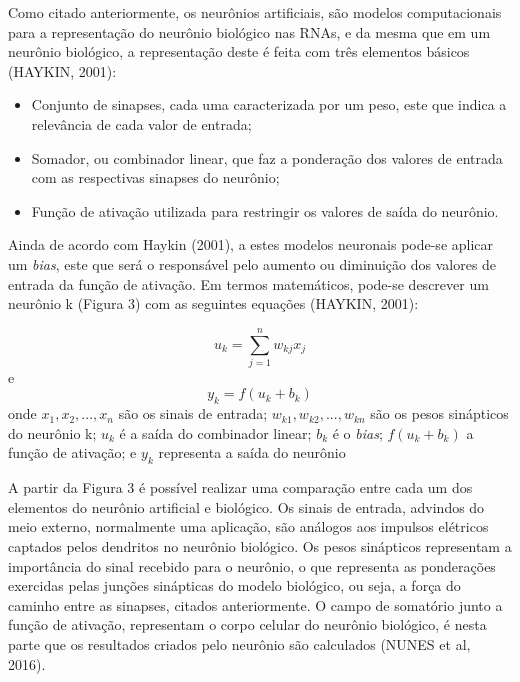 Como citado anteriormente, os neurônios artificiais, são modelos computacionais para a representação do neurônio biológico nas RNAs, e da mesma que em um neurônio biológico, a representação deste é feita com três elementos básicos (HAYKIN, 2001):  

\begin{itemize}
	\item Conjunto de sinapses, cada uma caracterizada por um peso, este que indica a relevância de cada valor de entrada;
	\item Somador, ou combinador linear, que faz a ponderação dos valores de entrada com as respectivas sinapses do neurônio;
	\item Função de ativação utilizada para restringir os valores de saída do neurônio.
\end{itemize}

Ainda de acordo com Haykin (2001), a estes modelos neuronais pode-se aplicar um \textit{bias}, este que será o responsável pelo aumento ou diminuição dos valores de entrada da função de ativação. Em termos matemáticos, pode-se descrever um neurônio k (Figura 3) com as seguintes equações (HAYKIN, 2001):

\begin{equation}
	u_{k} = \sum_{j=1}^{n} w_{kj} x_{j}
\end{equation}
e
\begin{equation}
	y_{k} = f(u_{k} + b_{k})	
\end{equation}
onde $ x_{1}, x_{2}, ..., x_{n} $ são os sinais de entrada; $ w_{k1}, w_{k2}, ..., w_{kn} $ são os pesos sinápticos do neurônio k; $ u_{k} $ é a saída do combinador linear; $ b_{k} $ é o \textit{bias}; $ f(u_{k} + b_{k}) $ a função de ativação; e $ y_{k} $ representa a saída do neurônio



A partir da Figura 3 é possível realizar uma comparação entre cada um dos elementos do neurônio artificial e biológico. Os sinais de entrada, advindos do meio externo, normalmente uma aplicação, são análogos aos impulsos elétricos captados pelos dendritos no neurônio biológico.  Os pesos sinápticos representam a importância do sinal recebido para o neurônio, o que representa as ponderações exercidas pelas junções sinápticas do modelo biológico, ou seja, a força do caminho entre as sinapses, citados anteriormente. O campo de somatório junto a função de ativação, representam o corpo celular do neurônio biológico, é nesta parte que os resultados criados pelo neurônio são calculados (NUNES et al, 2016).

